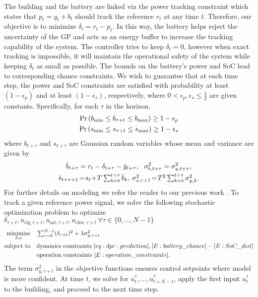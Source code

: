 The building and the battery are linked via the power tracking constraint which states that \(p_t = y_t + b_t\) should track the reference \(r_t\) at any time \(t\). Therefore, our objective is to minimize \(\delta_t = r_t - p_t\).
In this way, the battery helps reject the uncertainty of the GP and acts as an energy buffer to increase the tracking capability of the system. 
The controller tries to keep \(\delta_t = 0\), however when exact tracking is impossible, it will maintain the operational safety of the system while keeping \(\delta_t\)  as small as possible.
The bounds on the battery's power and SoC lead to corresponding chance constraints.
We wish to guarantee that at each time step, the power and SoC constraints are satisfied with probability at least \((1 - \epsilon_p)\) and  at least \((1 - \epsilon_s)\), respectively, where \(0 < \epsilon_p, \epsilon_s \leq \frac{1}{2}\) are given constants.
Specifically, for each \(\tau\) in the horizon,
	\begin{gather}
	\label{E:battery_chance}
	\Pr\left( \Pbmin \leq b_{\tau+t}\leq \Pbmax \right) \geq 1 - \epsilon_p  \\
	\label{E:SoC_chance}
	\Pr\left( \SOCmin \leq s_{\tau+t} \leq \SOCmax \right) \geq 1 - \epsilon_s 
	\end{gather}
where \(b_{t+\tau}\) and \(s_{t+\tau}\) are Gaussian random variables whose mean and variance are given by
\begin{gather}
\bar{b}_{t+\tau}= r_{t} - \delta_{t+\tau} - \bar{y}_{t+\tau}, \ \ 
\sigma^2_{b,t+\tau} =  \sigma^2_{y,t+\tau} \text, \label{E:battery_dist} \\
\bar{s}_{t+\tau+1}\!=\! s_t \!+\! T \textstyle\sum_{k=t}^{t+\tau} \bar{\Pbatt}_{k}, \,
\sigma^2_{s,\tau+1} \!=\! T^2 \textstyle\sum_{k=t}^{t+\tau} \sigma^2_{y,k} \text. \label{E:SoC_dist}
\end{gather}
For further details on modeling we refer the reader to our previous work \cite{nghiemetal16gp}.
To track a given reference power signal, we solve the following stochastic optimization problem to optimize \(\delta_{\tau+t},u_{\mathrm{clg},\tau+t},u_{\mathrm{sat},\tau+t},u_{\mathrm{chw},\tau+t} \ \forall \tau \in \{0,\dots,N-1\}\)
\begin{align}
\label{E:casestudy:mpc}
\minimize_{\delta, u} \quad & \textstyle\sum_{\tau=0}^{N-1} (\delta_{\tau+t})^2 + \lambda \sigma_{y,\tau+t}^2\\
\st \quad & \text{dynamics constraints } \eqref{eq:dpc:prediction}, \eqref{E:battery_chance} - \eqref{E:SoC_dist} \nonumber \\
&  \text{operation constraints } \eqref{E:operation_constraints}. \nonumber
\end{align}
The term \( \sigma_{y,\tau+t}^2\) in the objective functions ensures control setpoints where model is more confident.
At time \(t\), we solve for \(u^*_{t},\dots,u^*_{t+N-1} \), apply the first input \(u^*_{t} \) to the building, and proceed to the next time step.

